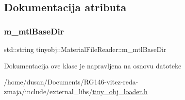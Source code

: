 \subsection{Dokumentacija atributa}
\mbox{\label{classtinyobj_1_1MaterialFileReader_aeb0081a32915ccf6c5c0612335eef560}} 
\subsubsection{\texorpdfstring{m\+\_\+mtl\+Base\+Dir}{m\_mtlBaseDir}}
{\footnotesize\ttfamily std\+::string tinyobj\+::\+Material\+File\+Reader\+::m\+\_\+mtl\+Base\+Dir\hspace{0.3cm}{\ttfamily [private]}}



Dokumentacija ove klase je napravljena na osnovu datoteke \begin{DoxyCompactItemize}
\item 
/home/dusan/\+Documents/\+R\+G146-\/vitez-\/reda-\/zmaja/include/external\+\_\+libs/\hyperlink{tiny__obj__loader_8h}{tiny\+\_\+obj\+\_\+loader.\+h}\end{DoxyCompactItemize}
